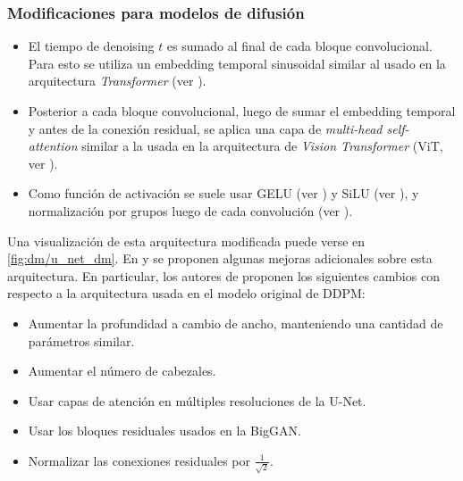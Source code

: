 \subsubsection{Modificaciones para modelos de difusión}
\begin{itemize}
	\item El tiempo de denoising $t$ es sumado al final de cada bloque convolucional. Para esto se utiliza un embedding temporal sinusoidal similar al usado en la arquitectura \textit{Transformer} (ver \cite{vaswani2023attention}).
	\item Posterior a cada bloque convolucional, luego de sumar el embedding temporal y antes de la conexión residual, se aplica una capa de \textit{multi-head self-attention} similar a la usada en la arquitectura de \textit{Vision Transformer} (ViT, ver \cite{dosovitskiy2021image}).
	\item Como función de activación se suele usar GELU (ver \cite{hendrycks2023gaussian}) y SiLU (ver \cite{elfwing2017sigmoidweighted}), y normalización por grupos luego de cada convolución (ver \cite{hafner2018tfdistvae}).
\end{itemize}

Una visualización de esta arquitectura modificada puede verse en \autoref{fig:dm/u_net_dm}. En \cite{nichol2021improved} y \cite{dhariwal2021diffusion} se proponen algunas mejoras adicionales sobre esta arquitectura. En particular, los autores de \cite{dhariwal2021diffusion} proponen los siguientes cambios con respecto a la arquitectura usada en el modelo original de DDPM:

\begin{itemize}
	\item Aumentar la profundidad a cambio de ancho, manteniendo una cantidad de parámetros similar.
	\item Aumentar el número de cabezales.
	\item Usar capas de atención en múltiples resoluciones de la U-Net.
	\item Usar los bloques residuales usados en la BigGAN.
	\item Normalizar las conexiones residuales por $\frac{1}{\sqrt{2}}$.
\end{itemize}


